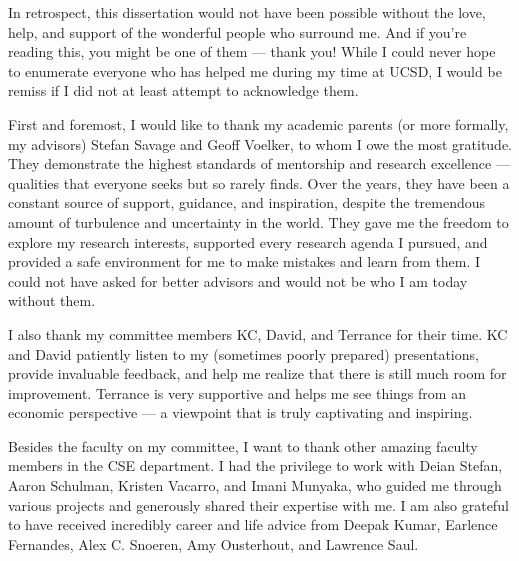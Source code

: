 \documentclass[12pt]{ucsddissertation}
\begin{document}
\begin{acknowledgements}
In retrospect, this dissertation would not have been possible without the love, help,  and support of the wonderful people who surround me. And if you're reading this, you might be one of them --- thank you!
While I could never hope to enumerate everyone who has helped me during my time at UCSD, I would be remiss if I did not at least attempt to acknowledge them. 


First and foremost, I would like to thank my academic parents (or more formally, my advisors) Stefan Savage and Geoff Voelker,
to whom I owe the most gratitude. They demonstrate the highest standards of mentorship and research excellence --- qualities that everyone seeks but so rarely finds.
Over the years, they have been a constant source of support, guidance, and inspiration, despite the tremendous amount of turbulence and uncertainty in the world. They gave me the freedom to explore my research interests, supported every research agenda I pursued, and provided a safe environment for me to make mistakes and learn from them. I could not have asked for better advisors and would not be who I am today without them.


I also thank my committee members KC, David, and Terrance for their time. KC and David patiently listen to my (sometimes poorly prepared) presentations, provide invaluable feedback, and help me realize that there is still much room for improvement. Terrance is very supportive and helps me see things from an economic perspective --- a viewpoint that is truly captivating and inspiring.

Besides the faculty on my committee, I want to thank other amazing faculty members in the CSE  department. I had the privilege to work with Deian Stefan, Aaron Schulman, Kristen Vacarro, and Imani Munyaka, who 
guided me through various projects and generously shared their expertise with me. I am also grateful to have received incredibly career and life advice from Deepak Kumar, Earlence Fernandes, Alex C. Snoeren, Amy Ousterhout, and Lawrence Saul.


\end{acknowledgements}
\end{document}
